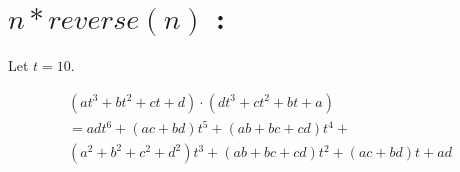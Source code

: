 \documentclass[10pt,a4paper,draft]{article}
\begin{document}
\section*{$ n * reverse(n) $ :}

Let $ t = 10 $. 

\begin{multline*}
( a t^3 + b t^2 + c t + d ) \cdot ( d t^3 + c t^2 + b t + a ) 
\\= a d t^6 + (a c + b d) t^5 + (a b + b c + c d) t^4 + 
\\ (a^2 + b^2 + c^2 + d^2 ) t^3 + (a b + b c + c d) t^2 + (a c + b d) t  + a d
\end{multline*}
\end{document}
